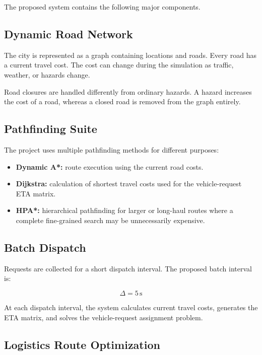 \documentclass[12pt,a4paper]{article}
\begin{document}
The proposed system contains the following major components.

\subsection{Dynamic Road Network}

The city is represented as a graph containing locations and roads.
Every road has a current travel cost. The cost can change during the
simulation as traffic, weather, or hazards change.

Road closures are handled differently from ordinary hazards. A
hazard increases the cost of a road, whereas a closed road is removed
from the graph entirely.

\subsection{Pathfinding Suite}

The project uses multiple pathfinding methods for different purposes:

\begin{itemize}
    \item \textbf{Dynamic A*:} route execution using the current road
    costs.
    \item \textbf{Dijkstra:} calculation of shortest travel costs
    used for the vehicle-request ETA matrix.
    \item \textbf{HPA*:} hierarchical pathfinding for larger or
    long-haul routes where a complete fine-grained search may be
    unnecessarily expensive.
\end{itemize}

\subsection{Batch Dispatch}

Requests are collected for a short dispatch interval. The proposed
batch interval is:

\begin{equation}
    \Delta = 5\,\mathrm{s}
    \label{eq:batch}
\end{equation}

At each dispatch interval, the system calculates current travel
costs, generates the ETA matrix, and solves the vehicle-request
assignment problem.

\subsection{Logistics Route Optimization}
\end{document}
